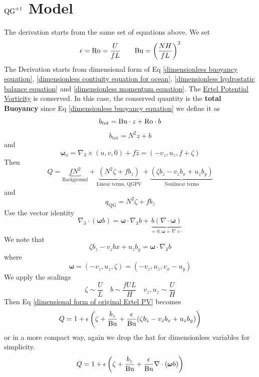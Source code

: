 \documentclass[../SQG_notes.tex]{subfiles}
\begin{document}
\section{\texorpdfstring{$\text{QG}^{+1}$}{QG1} Model}
    \label{sec:QGone model}


    The derivation starts from the same set of equations above. We set
    \[ \epsilon = \text{Ro} = \frac{U}{fL} \qquad \text{Bu} = \left( \frac{NH}{fL}\right)^2\]
    The Derivation starts from dimensional form of Eq \ref{dimensionless buoyancy equation}, \ref{dimensionless contiuity equation for ocean}, \ref{dimensionless hydrostatic balance equation} and \ref{dimensionless momentum equation}. The \hyperref[Ertel PV]{Ertel Potential Vorticity} is conserved. In this case, the conserved quantity is the \textbf{total Buoyancy} since Eq \ref{dimensionless buoyancy equation} we define it as 
    \[ b_{tot} = \text{Bu} \cdot z + \text{Ro} \cdot b \]
    \[ b_{\text{tot}} = N^2z + b\]
    and
    \[ \bm{\omega}_a = \nabla_3 \times (u,v,0) + f\hat{z} = (-v_z, u_z, f + \zeta)\]
    Then 
    \begin{equation} Q = \underbrace{fN^2}_{\text{Background}} + \underbrace{(N^2\zeta + fb_z)}_{\text{Linear terms, QGPV}} + \underbrace{(\zeta b_z - v_zb_x + u_zb_y)}_{\text{Nonlinear terms}}\label{dimensional form of original Ertel PV}
    \end{equation}
    and
    \[ q_{\text{QG}} = N^2 \zeta + fb_z\]
    Use the vector identity 
    \[ \nabla_3 \cdot (\bm{\omega} b) = \bm{\omega} \cdot \nabla_3 b + \underbrace{b (\nabla \cdot \bm{\omega})}_{=0, \bm{\omega} = \nabla \times \cdot}\]
    We note that 
    \[ \zeta b_z - v_z bx + u_z b_y = \bm{\omega} \cdot \nabla_3 b\]
    where 
    \[ \bm{\omega} = (-v_z, u_z, \zeta) = (-v_z, u_z, v_x - u_y)\]
    We apply the scalings
    \[ \zeta \sim \frac{U}{L} \quad b \sim \frac{fUL}{H} \quad v_z, u_z \sim \frac{U}{H}\]
    Then Eq \ref{dimensional form of original Ertel PV} becomes 
    \begin{equation}
        Q = 1 + \epsilon\left( \zeta + \frac{b_z}{\text{Bu}} + \frac{\epsilon }{\text{Bu}}(\zeta b_z - v_z b_x + u_z b_y)\right) \label{Dimensionless Ertel PV}
    \end{equation}
    or in a more compact way, again we drop the hat for dimensionless variables for simplicity.
    \begin{equation}
        Q = 1 + \epsilon\left( \zeta + \frac{b_z}{\text{Bu}} + \frac{\epsilon}{\text{Bu}} \nabla \cdot (\bm{\omega} b)\right)
        \label{Ture Dimensionless PV}
    \end{equation}
\end{document}

